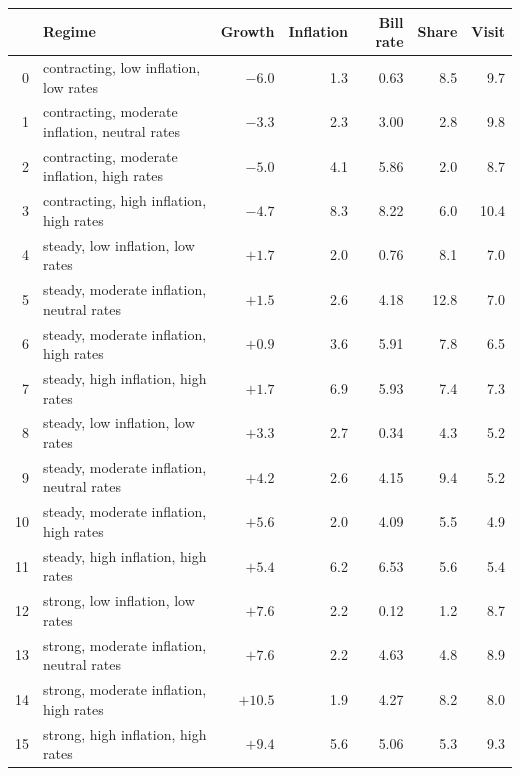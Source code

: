 \begin{tabular}{rlrrrrr}
\toprule
 & Regime & Growth & Inflation & Bill rate & Share & Visit \\
\midrule
0 & contracting, low inflation, low rates & $-6.0$ & 1.3 & 0.63 & 8.5 & 9.7 \\
1 & contracting, moderate inflation, neutral rates & $-3.3$ & 2.3 & 3.00 & 2.8 & 9.8 \\
2 & contracting, moderate inflation, high rates & $-5.0$ & 4.1 & 5.86 & 2.0 & 8.7 \\
3 & contracting, high inflation, high rates & $-4.7$ & 8.3 & 8.22 & 6.0 & 10.4 \\
4 & steady, low inflation, low rates & $+1.7$ & 2.0 & 0.76 & 8.1 & 7.0 \\
5 & steady, moderate inflation, neutral rates & $+1.5$ & 2.6 & 4.18 & 12.8 & 7.0 \\
6 & steady, moderate inflation, high rates & $+0.9$ & 3.6 & 5.91 & 7.8 & 6.5 \\
7 & steady, high inflation, high rates & $+1.7$ & 6.9 & 5.93 & 7.4 & 7.3 \\
8 & steady, low inflation, low rates & $+3.3$ & 2.7 & 0.34 & 4.3 & 5.2 \\
9 & steady, moderate inflation, neutral rates & $+4.2$ & 2.6 & 4.15 & 9.4 & 5.2 \\
10 & steady, moderate inflation, high rates & $+5.6$ & 2.0 & 4.09 & 5.5 & 4.9 \\
11 & steady, high inflation, high rates & $+5.4$ & 6.2 & 6.53 & 5.6 & 5.4 \\
12 & strong, low inflation, low rates & $+7.6$ & 2.2 & 0.12 & 1.2 & 8.7 \\
13 & strong, moderate inflation, neutral rates & $+7.6$ & 2.2 & 4.63 & 4.8 & 8.9 \\
14 & strong, moderate inflation, high rates & $+10.5$ & 1.9 & 4.27 & 8.2 & 8.0 \\
15 & strong, high inflation, high rates & $+9.4$ & 5.6 & 5.06 & 5.3 & 9.3 \\
\bottomrule
\end{tabular}
